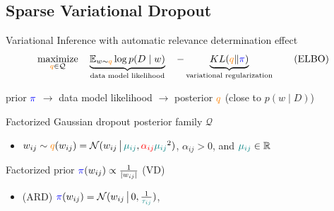 \documentclass{beamer}
\newcommand{\real}{\mathbb{R}}
\begin{document}
\subsection{Sparse Variational Dropout} %
\label{sub:sparse_variational_dropout}

\begin{frame}[c]{\insertsubsection}{\citep{molchanov_variational_2017}}
  Variational Inference with automatic relevance determination effect
  \begin{equation}
    \label{eq:elbo}
    \underset{
      {\color{orange} q} \in \mathcal{Q}
    }{\text{maximize}}
    \quad
    \underbrace{
      \mathbb{E}_{w \sim {\color{orange} q}}
          \log p(D\mid w)  %
    }_{
      \text{data model likelihood}
    }
    \quad
    - \underbrace{
      \mathop{KL}({\color{orange} q}\|{\color{blue} \pi})
    }_{
      \text{variational regularization}
    }
    \tag{ELBO}
  \end{equation}

  \medskip
  prior ${\color{blue} \pi}$
    $\to$ data model likelihood
    $\to$ posterior ${\color{orange} q}$
    (close to $p(w \mid D)$)

  \bigskip

  \pause
  \bigskip
  Factorized Gaussian dropout posterior family $\mathcal{Q}$
  \begin{itemize}
    \item $
      w_{ij} \sim {\color{orange} q}(w_{ij})
        = \mathcal{N}(
          w_{ij}\,\big\vert\,
          {\color{teal} \mu_{ij}},
          {\color{red} \alpha_{ij}}
            {\color{teal} \mu_{ij}}^2
        )
    $, $\alpha_{ij} > 0$, and ${\color{teal} \mu_{ij}} \in \real$
  \end{itemize}

  \pause
  \medskip
  Factorized prior $
    {\color{blue} \pi}(w_{ij})
      \propto \frac1{\lvert w_{ij}\rvert}
  $ (VD)
  \begin{itemize}
    \item (ARD) $
      {\color{blue} \pi}(w_{ij}) = \mathcal{N}(
        w_{ij}\,\big\vert\,
        0, \tfrac1{{\color{teal} \tau_{ij}}}
      )
    $, \citep{kharitonov_variational_2018}
  \end{itemize}

\end{frame}
\end{document}
